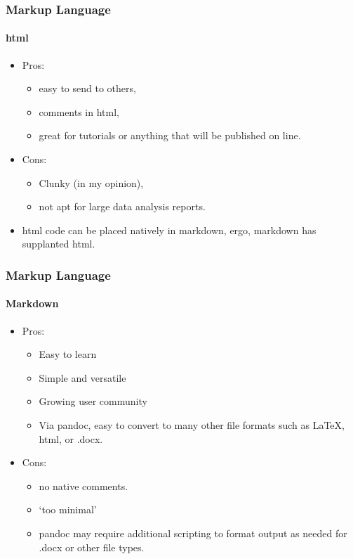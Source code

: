 \documentclass[t]{beamer}\usepackage[]{graphicx}\usepackage[]{color}
\begin{document}
\begin{frame}
  \frametitle{Markup Language}
  \framesubtitle{html}
  \begin{itemize}
    \item Pros: 
      \begin{itemize}
        \item easy to send to others, 
        \item comments in html, 
        \item great for tutorials or anything that will be published on line.
      \end{itemize}
    \item Cons: 
      \begin{itemize}
        \item Clunky (in my opinion), 
        \item not apt for large data analysis reports.
      \end{itemize}

    \item html code can be placed natively in markdown, ergo, markdown has
      supplanted html.
  \end{itemize}
\end{frame}

\begin{frame}
  \frametitle{Markup Language}
  \framesubtitle{Markdown}
  \begin{itemize}
    \item Pros: 
      \begin{itemize}
        \item Easy to learn 
        \item Simple and versatile
        \item Growing user community  
        \item Via pandoc, easy to convert to many other file formats such as
          \LaTeX, html, or .docx.
      \end{itemize}
    \item Cons: 
      \begin{itemize}
        \item no native comments.  
        \item `too minimal'
        \item pandoc may require additional scripting to format output as needed
          for .docx or other file types.
      \end{itemize}
  \end{itemize}
\end{frame}
\end{document}
